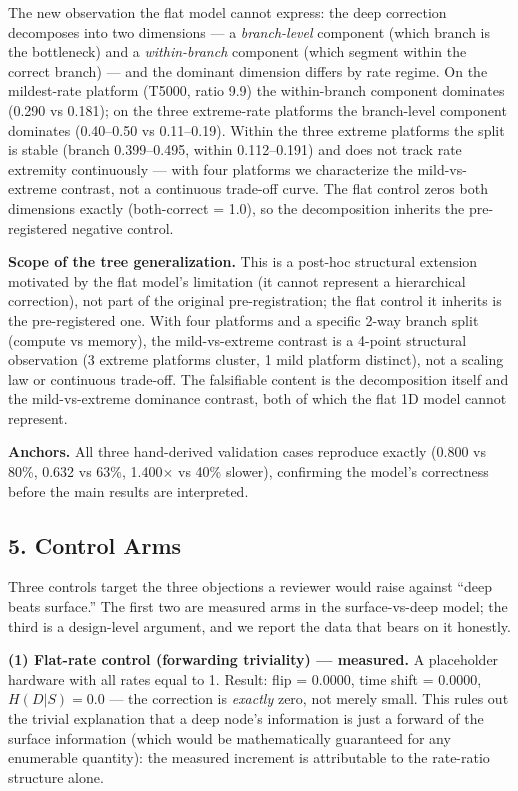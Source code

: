 {{{{The new observation the flat model cannot express: the deep correction decomposes into two dimensions --- a \emph{branch-level} component (which branch is the bottleneck) and a \emph{within-branch} component (which segment within the correct branch) --- and the dominant dimension differs by rate regime. On the mildest-rate platform (T5000, ratio 9.9) the within-branch component dominates (0.290 vs 0.181); on the three extreme-rate platforms the branch-level component dominates (0.40--0.50 vs 0.11--0.19). Within the three extreme platforms the split is stable (branch 0.399--0.495, within 0.112--0.191) and does not track rate extremity continuously --- with four platforms we characterize the mild-vs-extreme contrast, not a continuous trade-off curve. The flat control zeros both dimensions exactly (both-correct = 1.0), so the decomposition inherits the pre-registered negative control.

\textbf{Scope of the tree generalization.} This is a post-hoc structural extension motivated by the flat model's limitation (it cannot represent a hierarchical correction), not part of the original pre-registration; the flat control it inherits is the pre-registered one. With four platforms and a specific 2-way branch split (compute vs memory), the mild-vs-extreme contrast is a 4-point structural observation (3 extreme platforms cluster, 1 mild platform distinct), not a scaling law or continuous trade-off. The falsifiable content is the decomposition itself and the mild-vs-extreme dominance contrast, both of which the flat 1D model cannot represent.

\textbf{Anchors.} All three hand-derived validation cases reproduce exactly (0.800 vs 80\%, 0.632 vs 63\%, 1.400× vs 40\% slower), confirming the model's correctness before the main results are interpreted.

\subsection{5. Control Arms}\label{control-arms}

Three controls target the three objections a reviewer would raise against ``deep beats surface.'' The first two are measured arms in the surface-vs-deep model; the third is a design-level argument, and we report the data that bears on it honestly.

\textbf{(1) Flat-rate control (forwarding triviality) --- measured.} A placeholder hardware with all rates equal to 1. Result: flip = 0.0000, time shift = 0.0000, \(H(D|S) = 0.0\) --- the correction is \emph{exactly} zero, not merely small. This rules out the trivial explanation that a deep node's information is just a forward of the surface information (which would be mathematically guaranteed for any enumerable quantity): the measured increment is attributable to the rate-ratio structure alone.

}}}}
